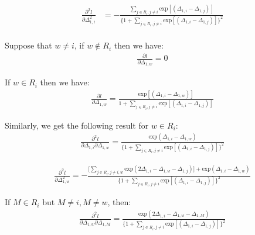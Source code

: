 \documentclass[]{article}
\begin{document}
\begin{equation}\begin{aligned}\label{eqn:secderivofPart}
\frac{\partial^2 l}{\partial \Delta_{1,i}^2} &= -\frac{\sum_{j\in R_i, j \ne i}^{}{}\text{exp}[(\Delta_{1,i}-\Delta_{1,j})]}{\big \{1+\sum_{j\in R_i, j \ne i}^{}{}\text{exp}[(\Delta_{1,i}-\Delta_{1,j})]\big \}^2 }
\\
\end{aligned}\end{equation}

Suppose that \(w\ne i\), if \(w\notin R_i\) then we have:
\begin{equation}\begin{aligned}\label{eqn:easyderiveforwnotini}
\frac{\partial l}{\partial \Delta_{1,w}} = 0
\end{aligned}\end{equation}

If \(w\in R_i\) then we have:
\begin{equation}\begin{aligned}\label{eqn:secderivofPart3}
\frac{\partial l}{\partial \Delta_{1,w}} = \frac{\text{exp}[(\Delta_{1,i}-\Delta_{1,w})]}{1+\sum_{j\in R_i, j \ne i}^{}{}\text{exp}[(\Delta_{1,i}-\Delta_{1,j})]}
\end{aligned}\end{equation}

Similarly, we get the following result for \(w\in R_i\):
\begin{equation}\begin{aligned}\label{eqn:result_forsecdr}
\frac{\partial^2 l}{\partial \Delta_{1,i} \partial \Delta_{1,w}} = \frac{\text{exp}(\Delta_{1,i}-\Delta_{1,w})}{\big\{1+\sum_{j\in R_i, j \ne i}^{}{}\text{exp}[(\Delta_{1,i}-\Delta_{1,j})]\big \}^2}
\end{aligned}\end{equation}

\begin{equation}\begin{aligned}\label{eqn:result_forsecdr2}
\frac{\partial^2 l}{\partial \Delta_{1,w}^2} = -\frac{\big[\sum_{j \in R_i, j \neq i,w}^{} \text{exp} (2\Delta_{1,i}-\Delta_{1,w}-\Delta_{1,j}) \big] + \text{exp}(\Delta_{1,i}-\Delta_{1,w})}{\big \{1+\sum_{j\in R_i, j \ne i}^{}{}\text{exp}[(\Delta_{1,i}-\Delta_{1,j})]\big\}^2}
\end{aligned}\end{equation}

If \(M \in R_i\) but \(M\neq i, M\neq w\), then:
\begin{equation}\begin{aligned}\label{eqn:result_forsecdrlast}
\frac{\partial^2 l}{\partial \Delta_{1,w} \partial \Delta_{1,M}} = \frac{\text{exp}(2\Delta_{1,i}-\Delta_{1,w}-\Delta_{1,M})}{\big\{1+\sum_{j\in R_i, j \ne i}^{}{}\text{exp}[(\Delta_{1,i}-\Delta_{1,j})]\big \}^2}
\end{aligned}\end{equation}
\end{document}
